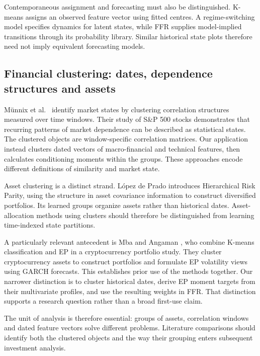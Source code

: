 \documentclass[11pt,a4paper]{article}
\begin{document}
Contemporaneous assignment and forecasting must also be distinguished. K-means assigns an observed feature vector using fitted centres. A regime-switching model specifies dynamics for latent states, while FFR supplies model-implied transitions through its probability library. Similar historical state plots therefore need not imply equivalent forecasting models.

\subsection{Financial clustering: dates, dependence structures and assets}

M\"unnix et al.\ \cite{munnix2012} identify market states by clustering correlation structures measured over time windows. Their study of S\&P 500 stocks demonstrates that recurring patterns of market dependence can be described as statistical states. The clustered objects are window-specific correlation matrices. Our application instead clusters dated vectors of macro-financial and technical features, then calculates conditioning moments within the groups. These approaches encode different definitions of similarity and market state.

Asset clustering is a distinct strand. L\'opez de Prado \cite{lopezdeprado2016} introduces Hierarchical Risk Parity, using the structure in asset covariance information to construct diversified portfolios. Its learned groups organize assets rather than historical dates. Asset-allocation methods using clusters should therefore be distinguished from learning time-indexed state partitions.

A particularly relevant antecedent is Mba and Angaman \cite{mbaangaman2023}, who combine K-means classification and EP in a cryptocurrency portfolio study. They cluster cryptocurrency assets to construct portfolios and formulate EP volatility views using GARCH forecasts. This establishes prior use of the methods together. Our narrower distinction is to cluster historical dates, derive EP moment targets from their multivariate profiles, and use the resulting weights in FFR. That distinction supports a research question rather than a broad first-use claim.

The unit of analysis is therefore essential: groups of assets, correlation windows and dated feature vectors solve different problems. Literature comparisons should identify both the clustered objects and the way their grouping enters subsequent investment analysis.
\end{document}
